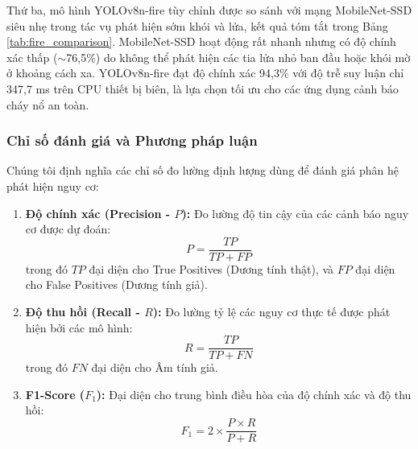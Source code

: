 \documentclass[12pt,a4paper]{article}
\begin{document}
Thứ ba, mô hình YOLOv8n-fire tùy chỉnh được so sánh với mạng MobileNet-SSD siêu nhẹ trong tác vụ phát hiện sớm khói và lửa, kết quả tóm tắt trong Bảng \ref{tab:fire_comparison}.
MobileNet-SSD hoạt động rất nhanh nhưng có độ chính xác thấp ($\sim$76,5\%) do không thể phát hiện các tia lửa nhỏ ban đầu hoặc khói mờ ở khoảng cách xa. YOLOv8n-fire đạt độ chính xác 94,3\% với độ trễ suy luận chỉ 347,7 ms trên CPU thiết bị biên, là lựa chọn tối ưu cho các ứng dụng cảnh báo cháy nổ an toàn.

\begin{table}[h]
    \centering
    \caption{So sánh các mô hình phát hiện hỏa hoạn (khói và lửa) trên phần cứng biên (CPU Mode)}
    \label{tab:fire_comparison}
\end{table}

\subsubsection*{Chỉ số đánh giá và Phương pháp luận}
Chúng tôi định nghĩa các chỉ số đo lường định lượng dùng để đánh giá phân hệ phát hiện nguy cơ:
\begin{enumerate}
    \item \textbf{Độ chính xác (Precision - $P$):} Đo lường độ tin cậy của các cảnh báo nguy cơ được dự đoán:
    \begin{equation}
        P = \frac{TP}{TP + FP}
    \end{equation}
    trong đó $TP$ đại diện cho True Positives (Dương tính thật), và $FP$ đại diện cho False Positives (Dương tính giả).
    
    \item \textbf{Độ thu hồi (Recall - $R$):} Đo lường tỷ lệ các nguy cơ thực tế được phát hiện bởi các mô hình:
    \begin{equation}
        R = \frac{TP}{TP + FN}
    \end{equation}
    trong đó $FN$ đại diện cho Âm tính giả.
    
    \item \textbf{F1-Score ($F_1$):} Đại diện cho trung bình điều hòa của độ chính xác và độ thu hồi:
    \begin{equation}
        F_1 = 2 \times \frac{P \times R}{P + R}
    \end{equation}
\end{enumerate}
\end{document}
